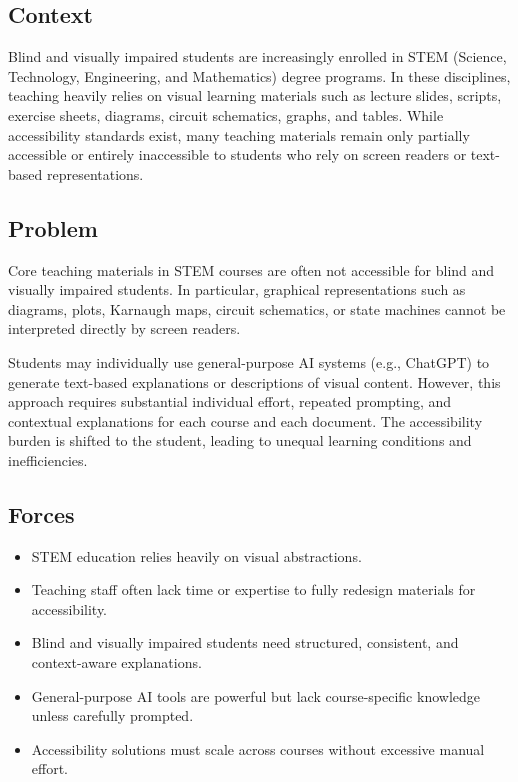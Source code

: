 \patternSix

\subsection*{Context}

Blind and visually impaired students are increasingly enrolled in STEM (Science, Technology, Engineering, and Mathematics) degree programs. In these disciplines, teaching heavily relies on visual learning materials such as lecture slides, scripts, exercise sheets, diagrams, circuit schematics, graphs, and tables. While accessibility standards exist, many teaching materials remain only partially accessible or entirely inaccessible to students who rely on screen readers or text-based representations.

\subsection*{Problem}

\begin{itshape}
Core teaching materials in STEM courses are often not accessible for blind and visually impaired students. In particular, graphical representations such as diagrams, plots, Karnaugh maps, circuit schematics, or state machines cannot be interpreted directly by screen readers.

Students may individually use general-purpose AI systems (e.g., ChatGPT) to generate text-based explanations or descriptions of visual content. However, this approach requires substantial individual effort, repeated prompting, and contextual explanations for each course and each document. The accessibility burden is shifted to the student, leading to unequal learning conditions and inefficiencies.
\end{itshape}

\subsection*{Forces}

\begin{itemize}
    \item STEM education relies heavily on visual abstractions.
    \item Teaching staff often lack time or expertise to fully redesign materials for accessibility.
    \item Blind and visually impaired students need structured, consistent, and context-aware explanations.
    \item General-purpose AI tools are powerful but lack course-specific knowledge unless carefully prompted.
    \item Accessibility solutions must scale across courses without excessive manual effort.
\end{itemize}

